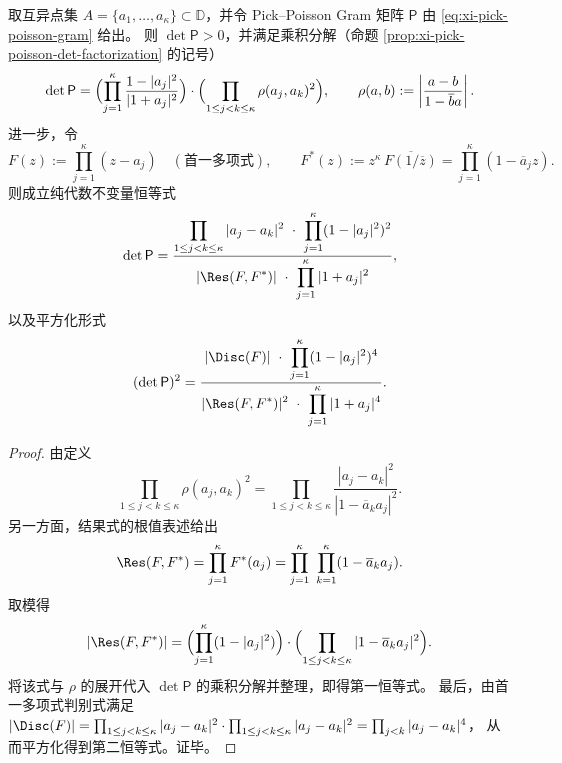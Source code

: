 
\begin{theorem}\label{thm:xi-pick-poisson-vandermonde-resultant-identity}
取互异点集 \(A=\{a_1,\dots,a_\kappa\}\subset\mathbb D\)，并令 Pick--Poisson Gram 矩阵 \(\mathsf P\) 由 \eqref{eq:xi-pick-poisson-gram} 给出。
则 \(\det\mathsf P>0\)，并满足乘积分解（命题 \ref{prop:xi-pick-poisson-det-factorization} 的记号）
\[
\det\mathsf P
=
\Bigl(\prod_{j=1}^{\kappa} \frac{1-|a_j|^2}{|1+a_j|^2}\Bigr)\cdot
\Bigl(\prod_{1\le j<k\le \kappa}\rho(a_j,a_k)^2\Bigr),
\qquad
\rho(a,b):=\left|\frac{a-b}{1-\overline b a}\right|.
\]
进一步，令
\[
F(z):=\prod_{j=1}^\kappa (z-a_j)\quad(\text{首一多项式}),\qquad
F^\ast(z):=z^\kappa\,\overline{F(1/\overline z)}=\prod_{j=1}^\kappa (1-\overline a_j z).
\]
则成立纯代数不变量恒等式
\[
\det\mathsf P
=
\frac{\displaystyle \prod_{1\le j<k\le\kappa}|a_j-a_k|^2\ \cdot\ \prod_{j=1}^\kappa (1-|a_j|^2)^2}
{\displaystyle |\Res(F,F^\ast)|\ \cdot\ \prod_{j=1}^\kappa |1+a_j|^2},
\]
以及平方化形式
\[
(\det\mathsf P)^2
=
\frac{\displaystyle |\Disc(F)|\ \cdot\ \prod_{j=1}^\kappa (1-|a_j|^2)^4}
{\displaystyle |\Res(F,F^\ast)|^2\ \cdot\ \prod_{j=1}^\kappa |1+a_j|^4}.
\]
\end{theorem}
\begin{proof}
由定义
\[
\prod_{1\le j<k\le\kappa}\rho(a_j,a_k)^2
=
\prod_{1\le j<k\le\kappa}\frac{|a_j-a_k|^2}{|1-\overline a_k a_j|^2}.
\]
另一方面，结果式的根值表述给出
\[
\Res(F,F^\ast)=\prod_{j=1}^\kappa F^\ast(a_j)
=\prod_{j=1}^\kappa\ \prod_{k=1}^\kappa (1-\overline a_k a_j).
\]
取模得
\[
|\Res(F,F^\ast)|
=
\Bigl(\prod_{j=1}^\kappa (1-|a_j|^2)\Bigr)\cdot
\Bigl(\prod_{1\le j<k\le\kappa}|1-\overline a_k a_j|^2\Bigr).
\]
将该式与 \(\rho\) 的展开代入 \(\det\mathsf P\) 的乘积分解并整理，即得第一恒等式。
最后，由首一多项式判别式满足
\(
|\Disc(F)|=\prod_{1\le j<k\le\kappa}|a_j-a_k|^2\cdot \prod_{1\le j<k\le\kappa}|a_j-a_k|^2
=\prod_{j<k}|a_j-a_k|^4
\)，
从而平方化得到第二恒等式。证毕。
\end{proof}

